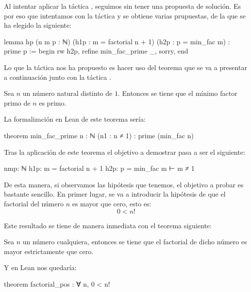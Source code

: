 \begin{itemize}
\begin{demostracion}
    Al intentar aplicar la táctica ,
    seguimos sin tener una propuesta de solución. Es por eso que intentamos con
    la táctica  y se obtiene varias prupuestas, de la
    que se ha elegido la siguiente:
    \begin{leancode}
lemma hp
  (n m p : ℕ)
  (h1p : m = factorial n + 1)
  (h2p : p = min_fac m)
  : prime p :=
begin
  rw h2p,
  refine min_fac_prime _,
  sorry,
end
    \end{leancode}

    Lo que la táctica  nos ha propuesto es hacer uso
    del teorema que se va a presentar a continuación junto con la táctica
    .

    \begin{teorema}
      Sea \(n\) un número natural distinto de \(1\). Entonces se tiene que el
      mínimo factor primo de \(n\) es primo.
    \end{teorema}

    La formalización en Lean de este teorema sería:
    \begin{leancode}
theorem min_fac_prime {n : ℕ} (n1 : n ≠ 1) : prime (min_fac n)
    \end{leancode}

    Tras la aplicación de este teorema el objetivo a demostrar pasa a ser el
    siguiente:
    \begin{leancode}
nmp: ℕ
h1p: m = factorial n + 1
h2p: p = min_fac m
⊢ m ≠ 1
    \end{leancode}

    De esta manera, si observamos las hipótesis que tenemos, el objetivo a probar
    es bastante sencillo. En primer lugar, se va a introducir la hipótesis de
    que el factorial del número \(n\) es mayor que cero, esto es:
    \begin{equation}
      0 < n!
    \end{equation}

    Este resultado se tiene de manera inmediata con el teorema siguiente:
    \begin{teorema}
      Sea \(n\) un número cualquiera, entonces se tiene que el factorial de dicho
      número es mayor estrictamente que cero.
    \end{teorema}

    Y en Lean nos quedaría:
    \begin{leancode}
theorem factorial_pos : ∀ n, 0 < n!
    \end{leancode}


\end{demostracion}
\end{itemize}
